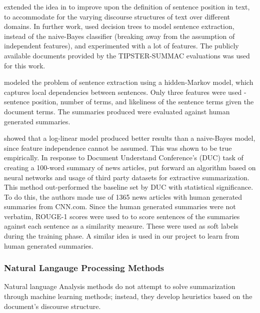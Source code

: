 \documentclass[BTech]{nitgoathesis}
\begin{document}
\par
\cite{linhovy} extended the idea in \cite{bax} to improve upon the definition of sentence position in text, to accommodate for the varying discourse structures of text over different domains. In further work, \cite{lin} used decision trees to model sentence extraction, instead of the naive-Bayes classifier (breaking away from the assumption of independent features), and experimented with a lot of features. The publicly available documents provided by the TIPSTER-SUMMAC evaluations was used for this work.

\par
\cite{conory} modeled the problem of sentence extraction using a hidden-Markov model, which captures local dependencies between sentences. Only three features were used - sentence position, number of terms, and likeliness of the sentence terms given the document terms. The summaries produced were evaluated against human generated summaries.

\par
\cite{osb} showed that a log-linear model produced better results than a naive-Bayes model, since feature independence cannot be assumed. This was shown to be true empirically.
In response to Document Understand Conference's (DUC) task of creating a 100-word summary of news articles, \cite{svore} put forward an algorithm based on neural networks and usage of third party datasets for extractive summarization. This method out-performed the baseline set by DUC with statistical significance. To do this, the authors made use of 1365 news articles with human generated summaries from CNN.com. Since the human generated summaries were not verbatim, ROUGE-1 scores \cite{lin} were used to to score sentences of the summaries against each sentence as a similarity measure. These were used as soft labels during the training phase. A similar idea is used in our project to learn from human generated summaries.

\subsubsection{Natural Langauge Processing Methods}
Natural language Analysis methods do not attempt to solve summarization through machine learning methods; instead, they develop heuristics based on the document’s discourse structure.
\par
\end{document}
